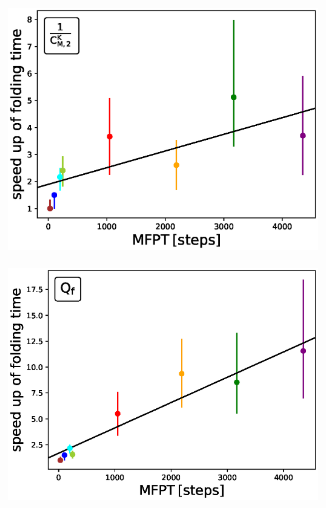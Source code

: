 \begin{figure}[H]
  \begin{subfigure}[t]{0.5\textwidth}
    \includegraphics[width=0.9\textwidth]{figures/compare_MD_speed_up_cmacro_kin_cont_50_6_steps10000_52.eps}
  \end{subfigure}
  \begin{subfigure}[t]{0.5\textwidth}
    \includegraphics[width=0.9\textwidth]{figures/compare_MD_speed_up_qcore_only_6_steps10000_52.eps}   
  \end{subfigure}
    \begin{subfigure}[t]{0.5\textwidth}

\end{subfigure}
\end{figure}
